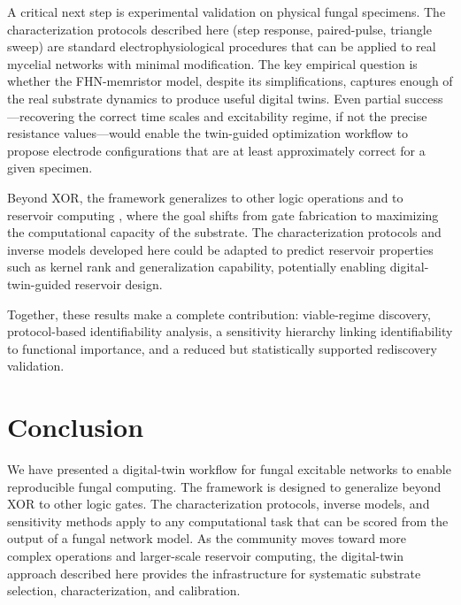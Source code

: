 \documentclass[letterpaper]{article}
\begin{document}
A critical next step is experimental validation on physical fungal specimens. The characterization protocols described here (step response, paired-pulse, triangle sweep) are standard electrophysiological procedures that can be applied to real mycelial networks with minimal modification. The key empirical question is whether the FHN-memristor model, despite its simplifications, captures enough of the real substrate dynamics to produce useful digital twins. Even partial success---recovering the correct time scales and excitability regime, if not the precise resistance values---would enable the twin-guided optimization workflow to propose electrode configurations that are at least approximately correct for a given specimen.

Beyond XOR, the framework generalizes to other logic operations and to reservoir computing \citep{maass2002real, jaeger2004harnessing}, where the goal shifts from gate fabrication to maximizing the computational capacity of the substrate. The characterization protocols and inverse models developed here could be adapted to predict reservoir properties such as kernel rank and generalization capability, potentially enabling digital-twin-guided reservoir design.

Together, these results make a complete contribution: viable-regime discovery, protocol-based identifiability analysis, a sensitivity hierarchy linking identifiability to functional importance, and a reduced but statistically supported rediscovery validation.

\section{Conclusion}
We have presented a digital-twin workflow for fungal excitable networks to enable reproducible fungal computing. The framework is designed to generalize beyond XOR to other logic gates. The characterization protocols, inverse models, and sensitivity methods apply to any computational task that can be scored from the output of a fungal network model. As the community moves toward more complex operations and larger-scale reservoir computing, the digital-twin approach described here provides the infrastructure for systematic substrate selection, characterization, and calibration.

\footnotesize


\end{document}
